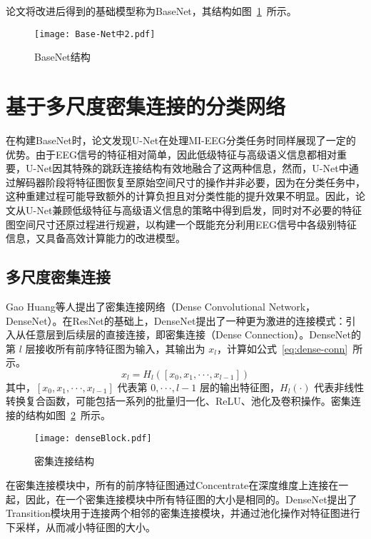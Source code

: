 论文将改进后得到的基础模型称为BaseNet，其结构如图~\ref{fig:BaseNet}~所示。
\begin{figure}[ht]
    \centering
    \texttt{[image: Base-Net中2.pdf]}
    \caption{BaseNet结构}
    \label{fig:BaseNet}
\end{figure}

\section{基于多尺度密集连接的分类网络}

在构建BaseNet时，论文发现U-Net在处理MI-EEG分类任务时同样展现了一定的优势。由于EEG信号的特征相对简单，因此低级特征与高级语义信息都相对重要，U-Net因其特殊的跳跃连接结构有效地融合了这两种信息，然而，U-Net中通过解码器阶段将特征图恢复至原始空间尺寸的操作并非必要，因为在分类任务中，这种重建过程可能导致额外的计算负担且对分类性能的提升效果不明显。因此，论文从U-Net兼顾低级特征与高级语义信息的策略中得到启发，同时对不必要的特征图空间尺寸还原过程进行规避，以构建一个既能充分利用EEG信号中各级别特征信息，又具备高效计算能力的改进模型。

\subsection{多尺度密集连接}

Gao Huang等人提出了密集连接网络（Dense Convolutional Network，DenseNet）\cite{huang2017densely}。在ResNet的基础上，DenseNet提出了一种更为激进的连接模式：引入从任意层到后续层的直接连接，即密集连接（Dense Connection）。DenseNet的第 \(l\) 层接收所有前序特征图为输入，其输出为 \(x_l\)，计算如公式~\ref{eq:dense-conn}~所示。
\begin{equation}
  x_l = H_l([x_0, x_1, ···, x_{l-1}])
  \label{eq:dense-conn}
\end{equation}
其中，\([x_0, x_1, ···, x_{l-1}]\) 代表第 \(0, ···, l-1\) 层的输出特征图，\(H_l(·)\) 代表非线性转换复合函数，可能包括一系列的批量归一化、ReLU、池化及卷积操作。密集连接的结构如图~\ref{fig:denseBlock}~所示。
\begin{figure}[ht]
  \centering
  \texttt{[image: denseBlock.pdf]}
  \caption{密集连接结构\cite{huang2017densely}}
  \label{fig:denseBlock}
\end{figure}

在密集连接模块中，所有的前序特征图通过Concentrate在深度维度上连接在一起，因此，在一个密集连接模块中所有特征图的大小是相同的。DenseNet提出了Transition模块用于连接两个相邻的密集连接模块，并通过池化操作对特征图进行下采样，从而减小特征图的大小。


